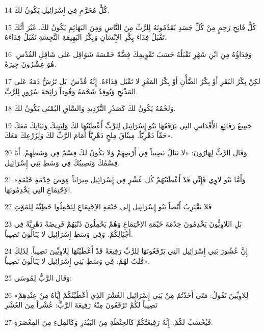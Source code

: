\par 14 كُلُّ مُحَرَّمٍ فِي إِسْرَائِيل يَكُونُ لكَ.
\par 15 كُلُّ فَاتِحِ رَحِمٍ مِنْ كُلِّ جَسَدٍ يُقَدِّمُونَهُ لِلرَّبِّ مِنَ النَّاسِ وَمِنَ البَهَائِمِ يَكُونُ لكَ. غَيْرَ أَنَّكَ تَقْبَلُ فِدَاءَ بِكْرِ الإِنْسَانِ وَبِكْرُ البَهِيمَةِ النَّجِسَةِ تَقْبَلُ فِدَاءَهُ.
\par 16 وَفِدَاؤُهُ مِنِ ابْنِ شَهْرٍ تَقْبَلُهُ حَسَبَ تَقْوِيمِكَ فِضَّةً خَمْسَةَ شَوَاقِل عَلى شَاقِلِ القُدْسِ. هُوَ عِشْرُونَ جِيرَةً.
\par 17 لكِنْ بِكْرُ البَقَرِ أَوْ بِكْرُ الضَّأْنِ أَوْ بِكْرُ المَعْزِ لا تَقْبَل فِدَاءَهُ. إِنَّهُ قُدْسٌ. بَل تَرُشُّ دَمَهُ عَلى المَذْبَحِ وَتُوقِدُ شَحْمَهُ وَقُوداً رَائِحَةَ سُرُورٍ لِلرَّبِّ.
\par 18 وَلحْمُهُ يَكُونُ لكَ كَصَدْرِ التَّرْدِيدِ وَالسَّاقِ اليُمْنَى يَكُونُ لكَ.
\par 19 جَمِيعُ رَفَائِعِ الأَقْدَاسِ التِي يَرْفَعُهَا بَنُو إِسْرَائِيل لِلرَّبِّ أَعْطَيْتُهَا لكَ وَلِبَنِيكَ وَبَنَاتِكَ مَعَكَ حَقّاً دَهْرِيّاً. مِيثَاقَ مِلحٍ دَهْرِيّاً أَمَامَ الرَّبِّ لكَ وَلِزَرْعِكَ مَعَكَ».
\par 20 وَقَال الرَّبُّ لِهَارُونَ: «لا تَنَالُ نَصِيباً فِي أَرْضِهِمْ وَلا يَكُونُ لكَ قِسْمٌ فِي وَسَطِهِمْ. أَنَا قِسْمُكَ وَنَصِيبُكَ فِي وَسَطِ بَنِي إِسْرَائِيل.
\par 21 «وَأَمَّا بَنُو لاوِي فَإِنِّي قَدْ أَعْطَيْتُهُمْ كُل عُشْرٍ فِي إِسْرَائِيل مِيرَاثاً عِوَضَ خِدْمَةِ خَيْمَةِ الاِجْتِمَاعِ التِي يَخْدِمُونَهَا.
\par 22 فَلا يَقْتَرِبُ أَيْضاً بَنُو إِسْرَائِيل إِلى خَيْمَةِ الاِجْتِمَاعِ لِيَحْمِلُوا خَطِيَّةً لِلمَوْتِ
\par 23 بَلِ اللاوِيُّونَ يَخْدِمُونَ خِدْمَةَ خَيْمَةِ الاِجْتِمَاعِ وَهُمْ يَحْمِلُونَ ذَنْبَهُمْ فَرِيضَةً دَهْرِيَّةً فِي أَجْيَالِكُمْ. وَفِي وَسَطِ إِسْرَائِيل لا يَنَالُونَ نَصِيباً.
\par 24 إِنَّ عُشُورَ بَنِي إِسْرَائِيل التِي يَرْفَعُونَهَا لِلرَّبِّ رَفِيعَةً قَدْ أَعْطَيْتُهَا لِلاوِيِّينَ نَصِيباً. لِذَلِكَ قُلتُ لهُمْ: فِي وَسَطِ بَنِي إِسْرَائِيل لا يَنَالُونَ نَصِيباً».
\par 25 وَقَال الرَّبُّ لِمُوسَى:
\par 26 «لِلاوِيِّينَ تَقُولُ: مَتَى أَخَذْتُمْ مِنْ بَنِي إِسْرَائِيل العُشْرَ الذِي أَعْطَيْتُكُمْ إِيَّاهُ مِنْ عِنْدِهِمْ نَصِيباً لكُمْ تَرْفَعُونَ مِنْهُ رَفِيعَةَ الرَّبِّ: عُشْراً مِنَ العُشْرِ
\par 27 فَيُحْسَبُ لكُمْ. إِنَّهُ رَفِيعَتُكُمْ كَالحِنْطَةِ مِنَ البَيْدَرِ وَكَالمِلءِ مِنَ المِعْصَرَةِ.
